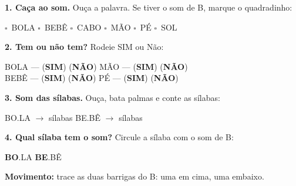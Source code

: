 \begin{somletra}
\textbf{1. Ca\c{c}a ao som.} Ou\c{c}a a palavra. Se tiver o som de B, marque o quadradinho:
\begin{center}
$\square$~BOLA \quad $\square$~BEB\^E \quad $\square$~CABO \quad $\square$~M\~AO \quad $\square$~P\'E \quad $\square$~SOL
\end{center}

\textbf{2. Tem ou n\~ao{} tem?} Rodeie SIM ou N\~ao:
\begin{center}
BOLA --- (\textbf{SIM}) (\textbf{N\~AO}) \quad M\~AO --- (\textbf{SIM}) (\textbf{N\~AO}) \\ BEB\^E --- (\textbf{SIM}) (\textbf{N\~AO}) \quad P\'E --- (\textbf{SIM}) (\textbf{N\~AO})
\end{center}
\end{somletra}

\begin{somsilaba}
\textbf{3. Som das s\'ilabas.} Ou\c{c}a, bata palmas e conte as s\'ilabas:
\begin{center}
BO.LA $\rightarrow$ \underline{\hspace{1cm}} s\'ilabas \quad BE.B\^E $\rightarrow$ \underline{\hspace{1cm}} s\'ilabas
\end{center}

\textbf{4. Qual s\'ilaba tem o som?} Circule a s\'ilaba com o som de B:
\begin{center}
\textbf{BO}.LA \quad \textbf{BE}.B\^E
\end{center}
\end{somsilaba}



\begin{motricidade}
\textbf{Movimento:} trace as duas barrigas do B: uma em cima, uma embaixo.
\begin{center}
\end{center}
\end{motricidade}

